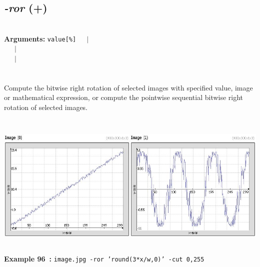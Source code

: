 \documentclass[a4paper,11pt,twoside]{book}
\begin{document}
\subsection{\emph{-ror} (+)}\vspace*{-0.5em}
~\\\textbf{Arguments: } 
{\small \texttt{value[\%]}}~~~$|$\\
\hspace*{2.2cm}{\small \texttt{[image]}}~~~$|$\\
~~~$|$\\
\\~\\
Compute the bitwise right rotation of selected images with specified value, image or
mathematical expression, or compute the pointwise sequential bitwise right rotation of
selected images.
\begin{center}\includegraphics[keepaspectratio=true,height=7cm,width=\textwidth]{img/gmic_def96.jpg}\\
{\footnotesize \textbf{Example 96~:} \texttt{image.jpg -ror 'round(3*x/w,0)' -cut 0,255}}
\end{center}
\end{document}
